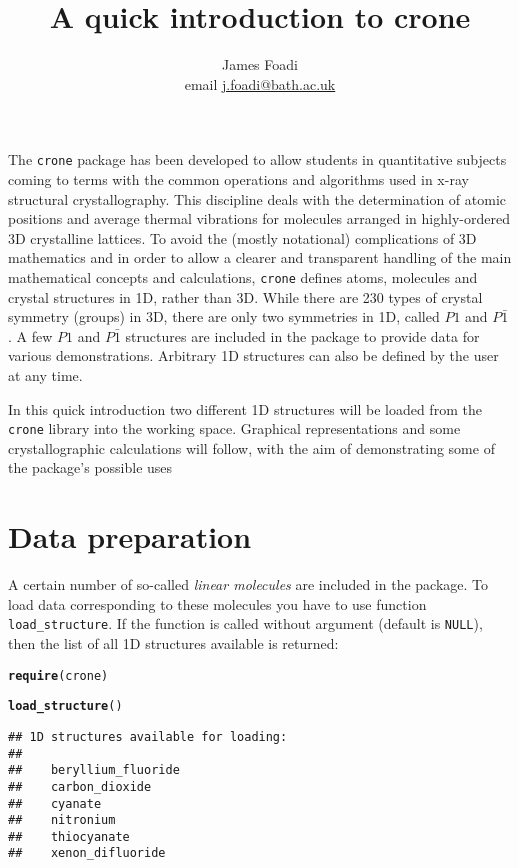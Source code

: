 \documentclass[12pt,a4paper]{article}\usepackage[]{graphicx}\usepackage[]{color}
\author{James Foadi \\ 
        email \href{mailto:j.foadi@bath.ac.uk}{j.foadi@bath.ac.uk}}
\title{A quick introduction to crone}
\makeatletter
\newcommand{\hlstd}[1]{\textcolor[rgb]{0.345,0.345,0.345}{#1}}%
\newcommand{\hlkwd}[1]{\textcolor[rgb]{0.737,0.353,0.396}{\textbf{#1}}}%
\newenvironment{kframe}{%
 \def\at@end@of@kframe{}%
 \ifinner\ifhmode%
  \def\at@end@of@kframe{\end{minipage}}%
  \begin{minipage}{\columnwidth}%
 \fi\fi%
 \def\FrameCommand##1{\hskip\@totalleftmargin \hskip-\fboxsep
 \colorbox{shadecolor}{##1}\hskip-\fboxsep
     \hskip-\linewidth \hskip-\@totalleftmargin \hskip\columnwidth}%
 \MakeFramed {\advance\hsize-\width
   \@totalleftmargin\z@ \linewidth\hsize
   \@setminipage}}%
 {\par\unskip\endMakeFramed%
 \at@end@of@kframe}
\newenvironment{knitrout}{}{} %
\makeatother
\begin{document}
\maketitle

The \texttt{crone} package has been developed to allow students in quantitative subjects coming to terms with the common operations and algorithms used in x-ray structural crystallography. This discipline deals with the determination of atomic positions and average thermal vibrations for molecules arranged in highly-ordered 3D crystalline lattices. To avoid the (mostly notational) complications of 3D mathematics and in order to allow a clearer and transparent handling of the main mathematical concepts and calculations, \texttt{crone} defines atoms, molecules and crystal structures in 1D, rather than 3D. While there are 230 types of crystal symmetry (groups) in 3D, there are only two symmetries in 1D, called $P1$ and $P\bar{1}$. A few $P1$ and $P\bar{1}$ structures are included in the package to provide data for various demonstrations. Arbitrary 1D structures can also be defined by the user at any time.

In this quick introduction two different 1D structures will be loaded from the \texttt{crone} library into the working space. Graphical representations and some crystallographic calculations will follow, with the aim of demonstrating some of the package's possible uses

\section{Data preparation}
A certain number of so-called \emph{linear molecules} are included in the package. To load data corresponding to these molecules you have to use function \texttt{load\_structure}. If the function is called without argument (default is \texttt{NULL}), then the list of all 1D structures available is returned:

\begin{knitrout}
\color{fgcolor}\begin{kframe}
\begin{alltt}
\hlkwd{require}\hlstd{(crone)}
\end{alltt}


{\ttfamily\noindent\itshape\color{messagecolor}{\#\# Loading required package: crone}}\begin{alltt}
\hlkwd{load_structure}\hlstd{()}
\end{alltt}
\begin{verbatim}
## 1D structures available for loading:
## 
##    beryllium_fluoride
##    carbon_dioxide
##    cyanate
##    nitronium
##    thiocyanate
##    xenon_difluoride
\end{verbatim}
\end{kframe}
\end{knitrout}
\end{document}
